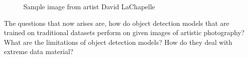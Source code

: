 \begin{figure}[H]
	\caption{\label{fig:dl_rapeofafrica} Sample image from artist David LaChapelle}
\end{figure}

The questions that now arises are, how do object detection models that are trained on traditional datasets perform on given images of artistic photography? What are the limitations of object detection models? How do they deal with extreme data material?